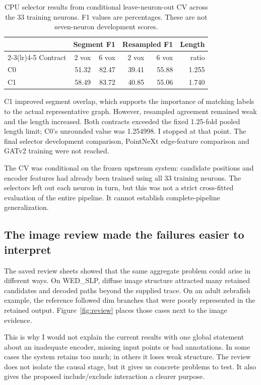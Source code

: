 \documentclass[11pt,a4paper]{article}
\newcommand{\evidence}[1]{~\cite{#1}}
\begin{document}
\begin{table}[htbp]
\centering
\caption{CPU selector results from conditional leave-neuron-out CV across the 33 training neurons. F1 values are percentages. These are not seven-neuron development scores.}
\small\setlength{\tabcolsep}{7pt}
\begin{tabular}{lrrrrr}
\toprule
& \multicolumn{2}{c}{Segment F1} & \multicolumn{2}{c}{Resampled F1} & Length\\
\cmidrule(lr){2-3}\cmidrule(lr){4-5}
Contract & 2 vox & 6 vox & 2 vox & 6 vox & ratio\\
\midrule
C0 & 51.32 & 82.47 & 39.41 & 55.88 & 1.255\\
C1 & 58.49 & 83.72 & 40.85 & 55.06 & 1.740\\
\bottomrule
\end{tabular}
\end{table}

C1 improved segment overlap, which supports the importance of matching labels to the actual representative graph. However, resampled agreement remained weak and the length increased. Both contracts exceeded the fixed 1.25-fold pooled length limit; C0's unrounded value was 1.254998. I stopped at that point. The final selector development comparison, PointNeXt edge-feature comparison and GATv2 training were not reached.\evidence{trees}

The CV was conditional on the frozen upstream system: candidate positions and encoder features had already been trained using all 33 training neurons. The selectors left out each neuron in turn, but this was not a strict cross-fitted evaluation of the entire pipeline. It cannot establish complete-pipeline generalization.

\subsection{The image review made the failures easier to interpret}
The saved review sheets showed that the same aggregate problem could arise in different ways. On WED\_SLP, diffuse image structure attracted many retained candidates and decoded paths beyond the supplied trace. On an adult zebrafish example, the reference followed dim branches that were poorly represented in the retained output. Figure~\ref{fig:review} places those cases next to the image evidence.\evidence{post}

This is why I would not explain the current results with one global statement about an inadequate encoder, missing input points or bad annotations. In some cases the system retains too much; in others it loses weak structure. The review does not isolate the causal stage, but it gives us concrete problems to test. It also gives the proposed include/exclude interaction a clearer purpose.
\end{document}
